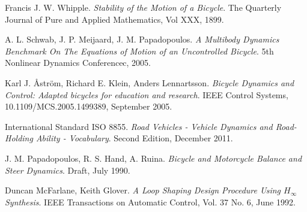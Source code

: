 \begin{thebibliography}{9}
Francis J. W. Whipple. \textit{Stability of the Motion of a Bicycle}. The Quarterly Journal of Pure and Applied Mathematics, Vol XXX, 1899.

A. L. Schwab, J. P. Meijaard, J. M. Papadopoulos. \textit{A Multibody Dynamics Benchmark On The Equations of Motion of an Uncontrolled Bicycle}. 5th Nonlinear Dynamics Conferencec, 2005. 

Karl J. \AA str{\"o}m, Richard E. Klein, Anders Lennartsson. \textit{Bicycle Dynamics and Control: Adapted bicycles for education and research}. IEEE Control Systems, 10.1109/MCS.2005.1499389, September 2005.
 
International Standard ISO 8855. \textit{Road Vehicles - Vehicle Dynamics and Road-Holding Ability - Vocabulary}. Second Edition, December 2011.

J. M. Papadopoulos, R. S. Hand, A. Ruina. \textit{Bicycle and Motorcycle Balance and Steer Dynamics}. Draft, July 1990.

Duncan McFarlane, Keith Glover. 
\textit{A Loop Shaping Design Procedure Using $H_{\infty}$ Synthesis}. IEEE Transactions on Automatic Control, Vol. 37 No. 6, June 1992.

\end{thebibliography}